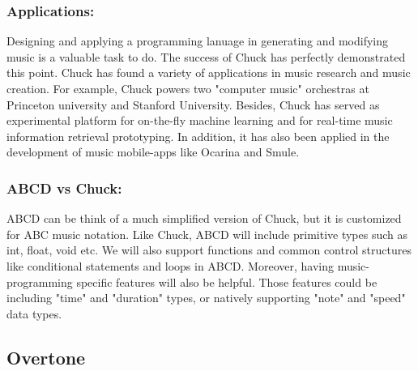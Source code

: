     \subsubsection{Applications:}
    Designing and applying a programming lanuage in generating and modifying music is a valuable task to do. The success of Chuck has perfectly demonstrated this point. Chuck has found a variety of applications in music research and music creation. For example, Chuck powers two "computer music" orchestras at Princeton university and Stanford University. Besides, Chuck has served as experimental platform for on-the-fly machine learning and for real-time music information retrieval prototyping\cite{Wang15}. In addition, it has also been applied in the development of music mobile-apps like Ocarina and Smule\cite{Wang15}. 

    \subsubsection{ABCD vs Chuck:}
    ABCD can be think of a much simplified version of Chuck, but it is customized for ABC music notation. Like Chuck, ABCD will include primitive types such as int, float, void etc. We will also support functions and common control structures like conditional statements and loops in ABCD. Moreover, having music-programming specific features will also be helpful. Those features could be including "time" and "duration" types, or natively supporting "note" and "speed" data types.
     

\subsection{Overtone}

